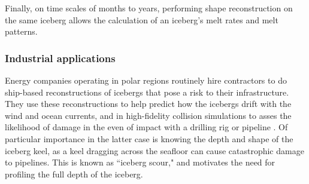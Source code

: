 Finally, on time scales of months to years, performing shape reconstruction on the same iceberg allows the calculation of an iceberg's melt rates and melt patterns.

\subsubsection{Industrial applications}

Energy companies operating in polar regions routinely hire contractors to do ship-based reconstructions of icebergs that pose a risk to their infrastructure. They use these reconstructions to help predict how the icebergs drift with the wind and ocean currents, and in high-fidelity collision simulations to asses the likelihood of damage in the even of impact with a drilling rig or pipeline \cite{ralph2008iceberg} \cite{fuglem1996iceberg}. Of particular importance in the latter case is knowing the depth and shape of the iceberg keel, as a keel dragging across the seafloor can cause catastrophic damage to pipelines. This is known as ``iceberg scour," and motivates the need for profiling the full depth of the iceberg.

%
%



